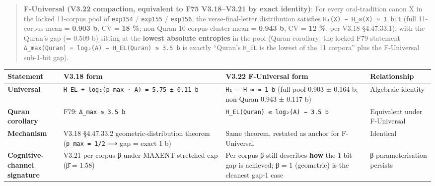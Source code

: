 \documentclass[
]{article}
\newcounter{none} %
\begin{document}
\begin{quote}
\textbf{F-Universal (V3.22 compaction, equivalent to F75 V3.18--V3.21 by
exact identity)}: For every oral-tradition canon X in the locked
11-corpus pool of \texttt{exp154} / \texttt{exp155} / \texttt{exp156},
the verse-final-letter distribution satisfies
\texttt{H₁(X)\ −\ H\_∞(X)\ ≈\ 1\ bit} (full 11-corpus mean =
\textbf{0.903 b}, CV = \textbf{18 \%}; non-Quran 10-corpus cluster mean
= \textbf{0.943 b}, CV = \textbf{12 \%}, per V3.18 §4.47.33.1), with the
Quran's gap (= 0.509 b) sitting at the \textbf{lowest absolute
entropies} in the pool (Quran corollary: the locked F79 statement
\texttt{Δ\_max(Quran)\ =\ log₂(A)\ −\ H\_EL(Quran)\ ≥\ 3.5\ b} is
exactly ``Quran's \texttt{H\_EL} is the lowest of the 11 corpora'' plus
the F-Universal sub-1-bit gap).
\end{quote}

{\def\LTcaptype{none} %
\begin{longtable}[]{@{}
  >{\raggedright\arraybackslash}p{}
  >{\raggedright\arraybackslash}p{}
  >{\raggedright\arraybackslash}p{}
  >{\raggedright\arraybackslash}p{}@{}}
\toprule\noalign{}
\begin{minipage}[b]{\linewidth}\raggedright
Statement
\end{minipage} & \begin{minipage}[b]{\linewidth}\raggedright
V3.18 form
\end{minipage} & \begin{minipage}[b]{\linewidth}\raggedright
V3.22 F-Universal form
\end{minipage} & \begin{minipage}[b]{\linewidth}\raggedright
Relationship
\end{minipage} \\
\midrule\noalign{}
\endhead
\bottomrule\noalign{}
\endlastfoot
\textbf{Universal} &
\texttt{H\_EL\ +\ log₂(p\_max\ ·\ A)\ =\ 5.75\ ±\ 0.11\ b} &
\texttt{H₁\ −\ H\_∞\ ≈\ 1\ b} (full pool 0.903 ± 0.164 b; non-Quran
0.943 ± 0.117 b) & Algebraic identity \\
\textbf{Quran corollary} & F79: \texttt{Δ\_max\ ≥\ 3.5\ b} &
\texttt{H\_EL(Quran)\ ≤\ log₂(A)\ −\ 3.5\ b} & Equivalent under
F-Universal \\
\textbf{Mechanism} & V3.18 §4.47.33.2 geometric-distribution theorem
(\texttt{p\_max\ =\ 1/2} ⟹ gap = exact 1 b) & Same theorem, restated as
anchor for F-Universal & Identical \\
\textbf{Cognitive-channel signature} & V3.21 per-corpus β under MAXENT
stretched-exp (β̄ = 1.58) & Per-corpus β still describes \textbf{how} the
1-bit gap is achieved; β = 1 (geometric) is the cleanest gap-1 case &
β-parameterisation persists \\
\end{longtable}
}
\end{document}
